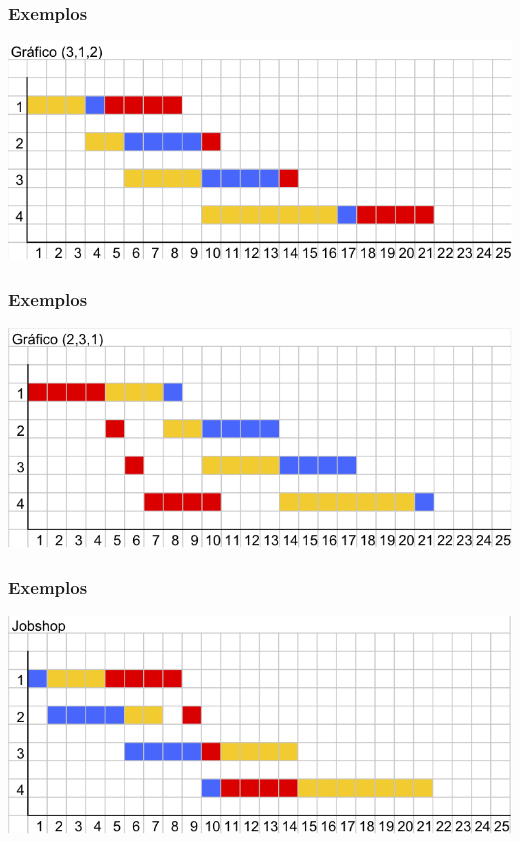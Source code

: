 \documentclass[12pt]{beamer}
\begin{document}
\begin{frame}
	\frametitle{Exemplos}
	\includegraphics[scale=.6]{graph3} 
\end{frame}
\begin{frame}
	\frametitle{Exemplos}
	\includegraphics[scale=.6]{graph4} 
\end{frame}
\begin{frame}
	\frametitle{Exemplos}
	\includegraphics[scale=.6]{graph5} 
\end{frame}
\end{document}
